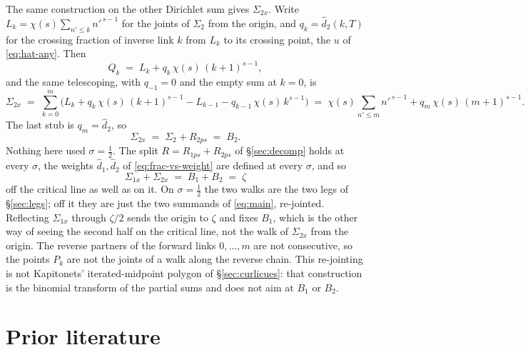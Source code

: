 \documentclass[11pt]{article}
\theoremstyle{definition}
\begin{document}
The same construction on the other Dirichlet sum gives \(\Sigma_{2x}\). Write
\(L_k=\chi(s)\sum_{n'\le k}n'^{\,s-1}\) for the joints of \(\Sigma_2\) from
the origin, and \(q_k=\hat d_2(k,T)\) for the crossing fraction of inverse
link \(k\) from \(L_k\) to its crossing point, the \(u\) of \eqref{eq:hat-any}. Then
\begin{equation}\label{eq:sum-2x-point}
Q_k
\;=\;
L_k+q_k\,\chi(s)\,(k+1)^{s-1},
\end{equation}
and the same telescoping, with \(q_{-1}=0\) and the empty sum at \(k=0\), is
\begin{equation}\label{eq:sum-2x}
\Sigma_{2x}
\;=\;
\sum_{k=0}^{m}\Biggl(
L_k+q_k\,\chi(s)\,(k+1)^{s-1}
-L_{k-1}-q_{k-1}\,\chi(s)\,k^{s-1}
\Biggr)
\;=\;
\chi(s)\sum_{n'\le m}n'^{\,s-1}+q_m\,\chi(s)\,(m+1)^{s-1}.
\end{equation}
The last stub is \(q_m=\hat d_2\), so
\begin{equation}\label{eq:sum-2x-B2}
\Sigma_{2x}
\;=\;
\Sigma_2+R_{2ps}
\;=\;
B_2.
\end{equation}
Nothing here used \(\sigma=\tfrac12\). The split
\(R=R_{1ps}+R_{2ps}\) of \S\ref{sec:decomp} holds at every \(\sigma\), the
weights \(\hat d_1,\hat d_2\) of \eqref{eq:frac-vs-weight} are defined at
every \(\sigma\), and so
\begin{equation}\label{eq:sum-x-zeta}
\Sigma_{1x}+\Sigma_{2x}
\;=\;
B_1+B_2
\;=\;
\zeta
\end{equation}
off the critical line as well as on it. On \(\sigma=\tfrac12\) the two walks
are the two legs of \S\ref{sec:legs}; off it they are just the two summands
of \eqref{eq:main}, re-jointed. Reflecting \(\Sigma_{1x}\) through
\(\zeta/2\) sends the origin to \(\zeta\) and fixes \(B_1\), which is the
other way of seeing the second half on the critical line, not the walk of
\(\Sigma_{2x}\) from the origin. The reverse partners of the forward links
\(0,\dots,m\) are not consecutive, so the points \(P_k\) are not the joints
of a walk along the reverse chain. This re-jointing is not Kapitonets'
iterated-midpoint polygon of \S\ref{sec:curlicues}: that construction is the
binomial transform of the partial sums and does not aim at \(B_1\) or
\(B_2\).

\section{Prior literature}\label{sec:prior-lit}
\end{document}
